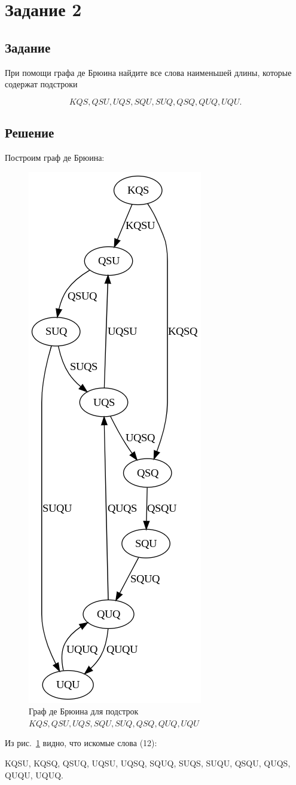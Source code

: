 \section*{Задание 2}

\subsection*{Задание}

При помощи графа де Брюина найдите все слова наименьшей длины,
которые содержат подстроки

$$ KQS, QSU, UQS, SQU, SUQ, QSQ, QUQ, UQU. $$

\subsection*{Решение}

Построим граф де Брюина:

\begin{figure}[H]
    \centering
    \includegraphics[width=0.28\linewidth]{photo/2s0}
    \caption{Граф де Брюина для подстрок $ KQS, QSU, UQS, SQU, SUQ, QSQ, QUQ, UQU $}
    \label{fig:2s0}
\end{figure}

Из рис.~\ref{fig:2s0} видно, что искомые слова (12):

KQSU,
KQSQ,
QSUQ,
UQSU,
UQSQ,
SQUQ,
SUQS,
SUQU,
QSQU,
QUQS,
QUQU,
UQUQ.
